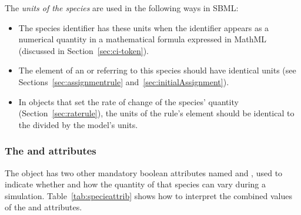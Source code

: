 The \emph{units of the species} are used in the following ways in
SBML:
\begin{itemize}

\item The species identifier has these units when the
    identifier appears as a numerical quantity in a mathematical
  formula expressed in MathML (discussed in
  Section~\ref{sec:ci-token}).

\item The  element of an \AssignmentRule or
  \InitialAssignment referring to this species should have identical
  units (see Sections~\ref{sec:assignmentrule}
  and~\ref{sec:initialAssignment}).

\item In \RateRule objects that set the rate of change of the
  species' quantity (Section~\ref{sec:raterule}), the units of the
  rule's  element should be identical to the
   divided by the model's
   units.

\end{itemize}


\subsubsection{The  and  attributes}
\label{sec:species-constant}

The \Species object has two other mandatory boolean attributes
named  and , used to
indicate whether and how the quantity of that species can vary
during a simulation.  Table~\ref{tab:specieattrib} shows how to
interpret the combined values of the  and
 attributes.

